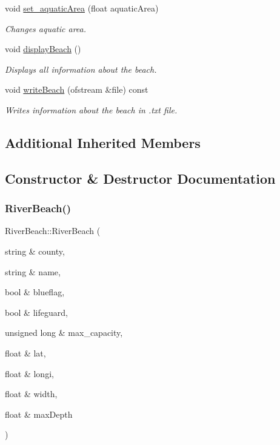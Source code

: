 \begin{DoxyCompactItemize}
void \hyperlink{class_river_beach_ac236cb64cc422eea722bb99fdb29d4d0}{set\+\_\+aquatic\+Area} (float aquatic\+Area)
\begin{DoxyCompactList}\small\item\em Changes aquatic area. \end{DoxyCompactList}\item 
\mbox{\label{class_river_beach_a1dba28cdd6d3c2dda666eb9f398cabbf}} 
void \hyperlink{class_river_beach_a1dba28cdd6d3c2dda666eb9f398cabbf}{display\+Beach} ()
\begin{DoxyCompactList}\small\item\em Displays all information about the beach. \end{DoxyCompactList}\item 
void \hyperlink{class_river_beach_acdbf29ab6540a2b0a5fd18cbea14375b}{write\+Beach} (ofstream \&file) const
\begin{DoxyCompactList}\small\item\em Writes information about the beach in .txt file. \end{DoxyCompactList}\end{DoxyCompactItemize}
\subsection*{Additional Inherited Members}


\subsection{Constructor \& Destructor Documentation}
\mbox{\label{class_river_beach_aa4964f12fe275b47b78fa5f1c52b0b32}} 
\subsubsection{\texorpdfstring{River\+Beach()}{RiverBeach()}\hspace{0.1cm}{\footnotesize\ttfamily [1/2]}}
{\footnotesize\ttfamily River\+Beach\+::\+River\+Beach (\begin{DoxyParamCaption}\item[{string \&}]{county,  }\item[{string \&}]{name,  }\item[{bool \&}]{blueflag,  }\item[{bool \&}]{lifeguard,  }\item[{unsigned long \&}]{max\+\_\+capacity,  }\item[{float \&}]{lat,  }\item[{float \&}]{longi,  }\item[{float \&}]{width,  }\item[{float \&}]{max\+Depth }\end{DoxyParamCaption})}



